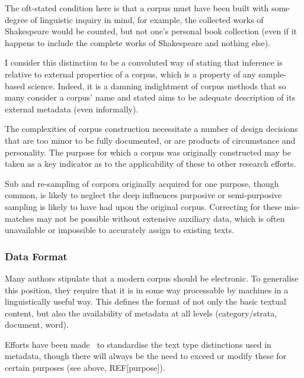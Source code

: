 The oft-stated condition here is that a corpus must have been built with some degree of linguistic inquiry in mind, for example, the collected works of Shakespeare would be counted, but not one's personal book collection (even if it happens to include the complete works of Shakespeare and nothing else). %

I consider this distinction to be a convoluted way of stating that inference is relative to external properties of a corpus, which is a property of any sample-based science.  Indeed, it is a damning indightment of corpus methods that so many consider a corpus' name and stated aims to be adequate description of its external metadata (even informally).  

The complexities of corpus construction necessitate a number of design decisions that are too minor to be fully documented, or are products of circumstance and personality.  The purpose for which a corpus was originally constructed may be taken as a key indicator as to the applicability of these to other research efforts.

Sub and re-sampling of corpora originally acquired for one purpose, though common, is likely to neglect the deep influences purposive or semi-purposive sampling is likely to have had upon the original corpus.  Correcting for these mis-matches may not be possible without extensive auxiliary data, which is often unavailable or impossible to accurately assign to existing texts.





\subsubsection{Data Format}
Many authors stipulate that a modern corpus should be electronic.  To generalise this position, they require that it is in some way processable by machines in a linguistically useful way.  This defines the format of not only the basic textual content, but also the availability of metadata at all levels (category/strata, document, word).

Efforts have been made~\cite{EagTcwgCtypeaglespreliminary}\cite{ide1995tei}%
%
%
to standardise the text type distinctions used in metadata, though there will always be the need to exceed or modify these for certain purposes (see above, REF[purpose]).

